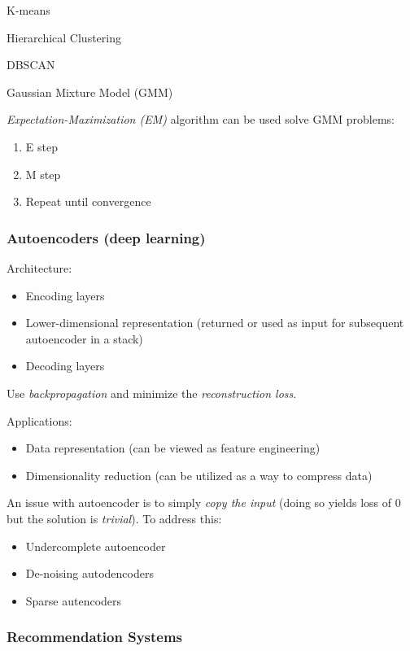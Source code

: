 \documentclass[10pt,landscape,letterpaper]{cheatsheet}
\begin{document}
\begin{multicols}{3}
K-means

Hierarchical Clustering

DBSCAN

Gaussian Mixture Model (GMM)

\emph{Expectation-Maximization (EM)} algorithm can be used solve GMM problems:

\begin{enumerate}
    \item E step
    \item M step
    \item[] Repeat until convergence
\end{enumerate}

\subsubsection{Autoencoders (deep learning)}

Architecture:

\begin{itemize}
    \item Encoding layers
    \item Lower-dimensional representation (returned or used as input for subsequent autoencoder in a stack)
    \item Decoding layers
\end{itemize}

Use \emph{backpropagation} and minimize the \emph{reconstruction loss}.

Applications:

\begin{itemize}
    \item Data representation (can be viewed as feature engineering)
    \item Dimensionality reduction (can be utilized as a way to compress data)
\end{itemize}

An issue with autoencoder is to simply \emph{copy the input} (doing so yields loss of 0 but the solution is \emph{trivial}). To address this:

\begin{itemize}
    \item Undercomplete autoencoder
    \item De-noising autodencoders
    \item Sparse autencoders
\end{itemize}

\subsubsection{Recommendation Systems}


\end{multicols}
\end{document}
